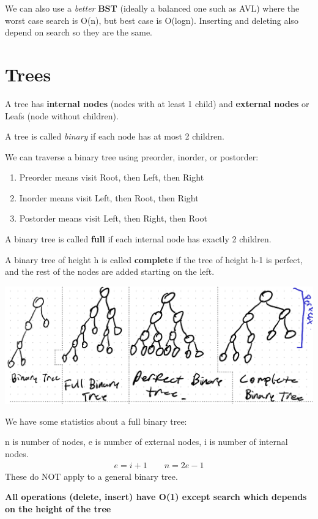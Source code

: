 \documentclass[12pt,letterpaper]{article} \usepackage{amsmath} \usepackage{graphicx} \usepackage[margin=1in]{geometry} \usepackage{longtable}  \usepackage{amssymb}
\begin{document}
	We can also use a \textit{better} \textbf{BST} (ideally a balanced one such as AVL) where the worst case search is O(n), but best case is O(logn). Inserting and deleting also depend on search so they are the same.
	
	\section{Trees}
	A tree has \textbf{internal nodes }(nodes with at least 1 child) and \textbf{external nodes }or Leafs (node without children).
	
	A tree is called \textit{binary} if each node has at most 2 children.
	
	We can traverse a binary tree using preorder, inorder, or postorder:
	\begin{enumerate}[noitemsep]
		\item Preorder means visit Root, then Left, then Right
		\item Inorder means visit Left, then Root, then Right
		\item Postorder means visit Left, then Right, then Root
	\end{enumerate}

	A binary tree is called \textbf{full} if each internal node has exactly 2 children.
	
	A binary tree of height h is called \textbf{complete} if the tree of height h-1 is perfect, and the rest of the nodes are added starting on the left.
	\begin{center}
		\includegraphics[width=0.8\linewidth]{trees}
	\end{center}

	We have some statistics about a full binary tree: 
	
	n is number of nodes, e is number of external nodes, i is number of internal nodes.
	\begin{align*}
		e = i+1\qquad n=2e-1
	\end{align*}
	These do NOT apply to a general binary tree.
	
	\textbf{All operations (delete, insert) have O(1) except search which depends on the height of the tree}
	
\end{document}

